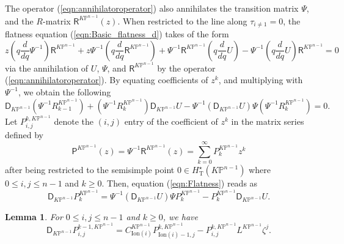 \documentclass[12pt]{amsart}
\newtheorem{lem}[prop]{Lemma}
\numberwithin{equation}{section}
\newcommand{\KP}{K\mathbb{P}}
\begin{document}
The operator (\ref{eqn:annihilatoroperator}) also annihilates the transition matrix $\Psi$, and the $R$-matrix $\mathsf{R}^{\KP^{n-1}}(z)$.  When restricted to the line along $\tau_{i\neq 1}=0$, the flatness equation (\ref{eqn:Basic_flatness_d}) takes of the form
\begin{equation*}
   z(q\frac{d}{dq}\Psi^{-1})\mathsf{R}^{\KP^{n-1}}+z\Psi^{-1}(q\frac{d}{dq}\mathsf{R}^{\KP^{n-1}})+\Psi^{-1}\mathsf{R}^{\KP^{n-1}} (q\frac{d}{dq}U)-\Psi^{-1}(q\frac{d}{dq}U) \mathsf{R}^{\KP^{n-1}}=0
\end{equation*}
via the annihilation of $U$, $\Psi$, and $\mathsf{R}^{\KP^{n-1}}$ by the operator (\ref{eqn:annihilatoroperator}).
By equating coefficients of $z^k$, and multiplying with $\Psi^{-1}$, we obtain the following
\begin{equation}\label{eqn:Flatness}
\mathsf{D}_{\KP^{n-1}}\left(\Psi^{-1}R^{\KP^{n-1}}_{k-1}\right)+\left(\Psi^{-1}R^{\KP^{n-1}}_k\right)\mathsf{D}_{\KP^{n-1}}U-\Psi^{-1}\left(\mathsf{D}_{\KP^{n-1}}U\right)\Psi\left(\Psi^{-1}R^{\KP^{n-1}}_k\right)=0.
\end{equation}
Let $P_{i,j}^{k,\KP^{n-1}}$ denote the $(i,j)$ entry of the coefficient of $z^k$ in the matrix series defined by 
\begin{equation}\label{eqn:Flat_to_modflat_KP_1}
\mathsf{P}^{\KP^{n-1}}(z)=\Psi^{-1}\mathsf{R}^{\KP^{n-1}}(z)=\sum_{k=0}^{\infty} P_k^{\KP^{n-1}} z^{k}
\end{equation}
after being restricted to the semisimple point $0\in H^{\star}_{\mathrm{T}}\left(\KP^{n-1}\right)$ where $0\leq i,j \leq{n-1}$ and $k\geq 0$.
Then, equation (\ref{eqn:Flatness}) reads as
\begin{equation*}\label{eqn:Flatness2}
\mathsf{D}_{\KP^{n-1}}P^{\KP^{n-1}}_k=\Psi^{-1}\left(\mathsf{D}_{\KP^{n-1}}U\right)\Psi{P^{\KP^{n-1}}_k}-P^{\KP^{n-1}}_k\mathsf{D}_{\KP^{n-1}}U.
\end{equation*}

\begin{lem}\label{lem:P_Flatness_with_C}
For ${0\leq{i,j}\leq{n-1}}$ and $k\geq{0}$, we have
\begin{equation*}
\mathsf{D}_{\KP^{n-1}}P_{i,j}^{k-1,\KP^{n-1}}=
C_{\mathrm{Ion}(i)}^{\KP^{n-1}}P_{\mathrm{Ion}(i)-1,j}^{k,\KP^{n-1}}-P_{i,j}^{k,\KP^{n-1}}L^{\KP^{n-1}}\zeta^j.
\end{equation*}
\end{lem}
\end{document}
